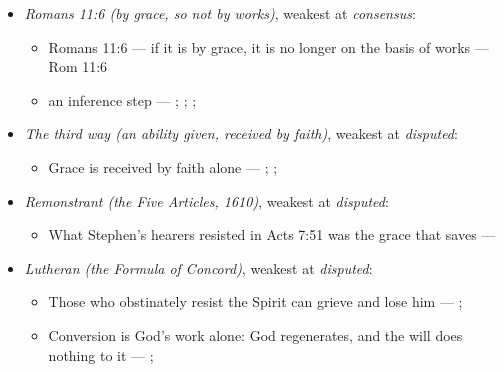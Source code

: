 \documentclass[11pt]{article}
\begin{document}
\begin{itemize}
\begin{itemize}
\item an inference step --- \cite[I-II q.111 a.2]{aquinas-summa-1920}; \cite[Canons of Dort, III/IV, art. 12]{schaff-creeds-christendom-3-1977}; \cite[Trent, Session VI (1547), canon 4]{tanner-decrees-1990}; \cite[45]{waterworth-trent-1848}
\item an inference step --- \cite[I-II q.10 a.4 ad 3]{aquinas-summa-1920}; \cite[I-II q.112 a.3]{aquinas-summa-1920}; \cite[Trent, Session VI (1547), canon 4]{tanner-decrees-1990}; \cite[45]{waterworth-trent-1848}
\end{itemize}
\item \emph{Romans 11:6 (by grace, so not by works)}, weakest at \emph{consensus}:
\begin{itemize}
\item Romans 11:6 — if it is by grace, it is no longer on the basis of works --- Rom 11:6
\item an inference step --- \cite[Trent, Session VI (1547), ch. 8]{tanner-decrees-1990}; \cite[36]{waterworth-trent-1848}; \cite[Five Arminian Articles (1610), art. 4]{schaff-creeds-christendom-3-1977}; \cite[Canons of Dort, III/IV, art. 10]{schaff-creeds-christendom-3-1977}
\end{itemize}
\item \emph{The third way (an ability given, received by faith)}, weakest at \emph{disputed}:
\begin{itemize}
\item Grace is received by faith alone --- \cite[Augsburg Confession IV.1–3]{concordia-triglotta-1921}; \cite[Sermon 1, III.1]{wesley-sermons-1872}; \cite[Trent, Session VI (1547), canon 9]{tanner-decrees-1990}
\end{itemize}
\item \emph{Remonstrant (the Five Articles, 1610)}, weakest at \emph{disputed}:
\begin{itemize}
\item What Stephen’s hearers resisted in Acts 7:51 was the grace that saves --- \cite[Five Arminian Articles (1610), art. 4]{schaff-creeds-christendom-3-1977}
\end{itemize}
\item \emph{Lutheran (the Formula of Concord)}, weakest at \emph{disputed}:
\begin{itemize}
\item Those who obstinately resist the Spirit can grieve and lose him --- \cite[Solid Declaration II.83]{concordia-triglotta-1921}; \cite[Solid Declaration XI.42]{concordia-triglotta-1921}
\item Conversion is God’s work alone: God regenerates, and the will does nothing to it --- \cite[Solid Declaration II.89]{concordia-triglotta-1921}; \cite[Solid Declaration II.90]{concordia-triglotta-1921}

\end{itemize}
\end{itemize}
\end{document}
